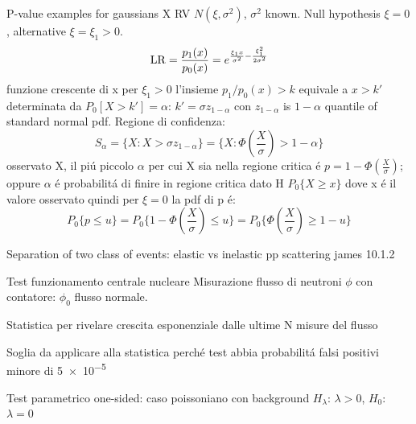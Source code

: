 \documentclass[asd-beamer.tex]{subfiles}%
\begin{document}
\begin{wordonframe}{P-value examples for gaussians}
	X RV $N(\xi,\sigma^2)$, $\sigma^2$ known. Null hypothesis $\xi=0$, alternative $\xi=\xi_1>0$.
	\begin{equation*}
	\operatorname{LR}=\frac{p_1(x)}{p_0(x)}=e^{\frac{\xi_1x}{\sigma^2}-\frac{\xi_1^2}{2\sigma^2}}
	\end{equation*}
	funzione crescente di x per $\xi_1>0$ l'insieme $p_1/p_0(x)>k$ equivale a $x>k'$ determinata da $P_0[X>k']=\alpha$: $k'=\sigma z_{1-\alpha}$ con $z_{1-\alpha}$ is $1-\alpha$ quantile of standard normal pdf.
	Regione di confidenza:
	\begin{equation*}
	S_{\alpha}=\{X: X>\sigma z_{1-\alpha}\}=\{X: \Phi(\frac{X}{\sigma})>1-\alpha\}
	\end{equation*}
	osservato X, il pi\'u piccolo $\alpha$ per cui X sia nella regione critica \'e $p=1-\Phi(\frac{X}{\sigma})$; oppure $\alpha$ \'e probabilit\'a di finire in regione critica dato H $P_0\{X\geq x\}$ dove x \'e il valore osservato quindi per $\xi=0$ la pdf di p \'e:
	\begin{equation*}
	P_0\{p\leq u\}=P_0\{1-\Phi(\frac{X}{\sigma})\leq u\}=P_0\{\Phi(\frac{X}{\sigma})\geq 1-u\}
	\end{equation*}
\end{wordonframe}

\begin{frame}{Separation of two class of events: elastic vs inelastic pp scattering}
james 10.1.2
\end{frame}

\begin{frame}{Test funzionamento centrale nucleare}\frameintoc
Misurazione flusso di neutroni $\phi$ con contatore: $\phi_0$ flusso normale.
\begin{block}{Statistica per rivelare crescita esponenziale dalle ultime N misure del flusso}

\end{block}
\begin{block}{Soglia da applicare alla statistica perch\'e test abbia probabilit\'a falsi positivi minore di \num{5e-5}}

\end{block}
\end{frame}

\begin{frame}{Test parametrico one-sided: caso poissoniano con background}
$H_{\lambda}$: $\lambda>0$, $H_0$: $\lambda=0$
\end{frame}
\end{document}

